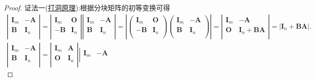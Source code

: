 \documentclass[../../main.tex]{subfiles}
\begin{document}
\begin{proof}
{\color{blue}证法一(\hyperref[proposition:打洞原理]{打洞原理}):}根据分块矩阵的初等变换可得\begin{align*}
\left| \begin{matrix}
\boldsymbol{I}_m&		-\boldsymbol{A}\\
\boldsymbol{B}&		\boldsymbol{I}_n\\
\end{matrix} \right|=\left| \begin{matrix}
\boldsymbol{I}_m&		\boldsymbol{O}\\
-\boldsymbol{B}&		\boldsymbol{I}_n\\
\end{matrix} \right|\left| \begin{matrix}
\boldsymbol{I}_m&		-\boldsymbol{A}\\
\boldsymbol{B}&		\boldsymbol{I}_n\\
\end{matrix} \right|=\left| \left( \begin{matrix}
\boldsymbol{I}_m&		\boldsymbol{O}\\
-\boldsymbol{B}&		\boldsymbol{I}_n\\
\end{matrix} \right) \left( \begin{matrix}
\boldsymbol{I}_m&		-\boldsymbol{A}\\
\boldsymbol{B}&		\boldsymbol{I}_n\\
\end{matrix} \right) \right|=\left| \begin{matrix}
\boldsymbol{I}_m&		-\boldsymbol{A}\\
\boldsymbol{O}&		\boldsymbol{I}_n+\boldsymbol{BA}\\
\end{matrix} \right|=\left| \boldsymbol{I}_n+\boldsymbol{BA} \right|.
\\
\left| \begin{matrix}
\boldsymbol{I}_m&		-\boldsymbol{A}\\
\boldsymbol{B}&		\boldsymbol{I}_n\\
\end{matrix} \right|=\left| \begin{matrix}
\boldsymbol{I}_m&		\boldsymbol{A}\\
\boldsymbol{O}&		\boldsymbol{I}_n\\
\end{matrix} \right|\left| \begin{matrix}
\boldsymbol{I}_m&		-\boldsymbol{A}\\

\end{matrix}
\end{align*}
\end{proof}
\end{document}
